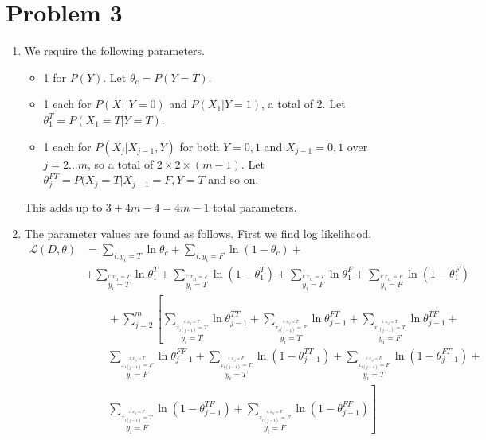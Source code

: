 \documentclass{article}
\begin{document}
\section*{Problem 3}
\begin{enumerate}
\item We require the following parameters.
  \begin{itemize}
  \item 1 for $P(Y)$. Let $\theta_c=P(Y=T)$.
  \item 1 each for $P(X_1|Y=0)$ and $P(X_1|Y=1)$, a total of 2. Let $\theta_1^T=P(X_1=T|Y=T)$. 
  \item 1 each for $P(X_j|X_{j-1},Y)$ for both $Y=0,1$ and $X_{j-1}=0,1$
    over $j=2\ldots m$, so a total of $2\times 2\times (m-1)$. Let $\theta_j^{FT}=P(X_j=T|X_{j-1}=F,Y=T$ and so on. 
  \end{itemize}
  This adds up to $3+4m-4=4m-1$ total parameters.
\item The parameter values are found as follows. First we find log likelihood. 
  \begin{align*}
    \mathcal L(D,\theta) &=
    \sum_{i:y_i=T}\ln \theta_c + \sum_{i:y_i=F}\ln (1-\theta_c) + \\ &
    + \sum_{\stackrel{i:x_{i1}=T}{y_i=T}} \ln \theta_1^T + \sum_{\stackrel{i:x_{i1}=F}{y_i=T}}\ln(1-\theta_1^T)
    + \sum_{\stackrel{i:x_{i1}=T}{y_i=F}} \ln \theta_1^F + \sum_{\stackrel{i:x_{i1}=F}{y_i=F}}\ln(1-\theta_1^F)\\
    &\qquad + \sum_{j=2}^{m} 
    \left[ 
      \sum_{\stackrel{\stackrel{i:x_{ij}=T}{x_{i(j-1)}=T}}{y_i=T}}\ln \theta_{j-1}^{TT} + 
      \sum_{\stackrel{\stackrel{i:x_{ij}=T}{x_{i(j-1)}=F}}{y_i=T}}\ln \theta_{j-1}^{FT} + 
      \sum_{\stackrel{\stackrel{i:x_{ij}=T}{x_{i(j-1)}=T}}{y_i=F}}\ln \theta_{j-1}^{TF} +  \right.\\
      &\qquad\sum_{\stackrel{\stackrel{i:x_{ij}=T}{x_{i(j-1)}=F}}{y_i=F}}\ln \theta_{j-1}^{FF} +  
      \sum_{\stackrel{\stackrel{i:x_{ij}=F}{x_{i(j-1)}=T}}{y_i=T}}\ln (1-\theta_{j-1}^{TT}) + 
      \sum_{\stackrel{\stackrel{i:x_{ij}=F}{x_{i(j-1)}=F}}{y_i=T}}\ln (1-\theta_{j-1}^{FT}) +\\ 
      &\qquad\left.\sum_{\stackrel{\stackrel{i:x_{ij}=F}{x_{i(j-1)}=T}}{y_i=F}}\ln (1-\theta_{j-1}^{TF}) + 
      \sum_{\stackrel{\stackrel{i:x_{ij}=F}{x_{i(j-1)}=F}}{y_i=F}}\ln (1-\theta_{j-1}^{FF})
      \right] \\
  \end{align*}


\end{enumerate}
\end{document}
